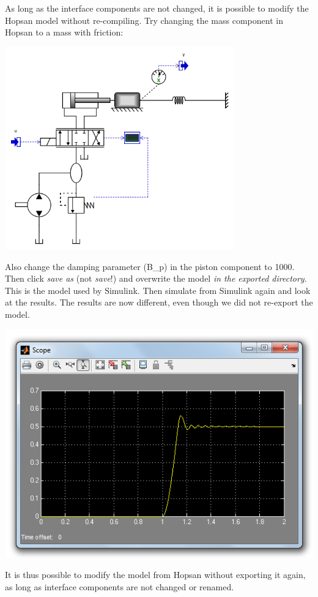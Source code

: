 \documentclass[a4paper]{article}
\begin{document}
\begin{enumerate}
As long as the interface components are not changed, it is possible to modify the Hopsan model without re-compiling.
Try changing the mass component in Hopsan to a mass with friction:

\includegraphics[height=8.73753cm]{gfx/simulink/modifiedmodel.png}

Also change the damping parameter (B\_p) in the piston component to 1000.
Then click \textit{save as} (not \textit{save}!) and overwrite the model \textit{in the exported directory}.
This is the model used by Simulink.
Then simulate from Simulink again and look at the results.
The results are now different, even though we did not re-export the model.

\includegraphics[width=0.6\linewidth]{gfx/simulink/simulinkplot2.png}

It is thus possible to modify the model from Hopsan without exporting it again, as long as interface components are not changed or renamed.

\end{enumerate}
\end{document}
